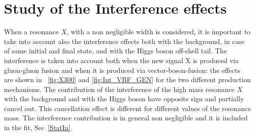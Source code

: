 \section{Study of the Interference effects}
\label{sec:interference}
When a resonance $X$, with a non negligible width is considered, it is important to take into account also the interference effects both with the \WW background, in case of same initial and final state, and with the Higgs boson off-shell tail. 
The interference is taken into account both when the new signal X is produced via gluon-gluon fusion and when it is produced via vector-boson-fusion:
the effects are shown in ~\ref{fig:X300} and  \ref{fig:Int_VBF_GEN} for the two different production mechanisms.  The contribution of the interference of the high mass resonance $X$ with the \WW background and with the Higgs boson have opposite sign and partially cancel out. This cancellation effect is different for different values of the resonance mass.
The interference contribution is in general non negligible and it is included in the fit, Sec~\ref{StatIn}. \\
